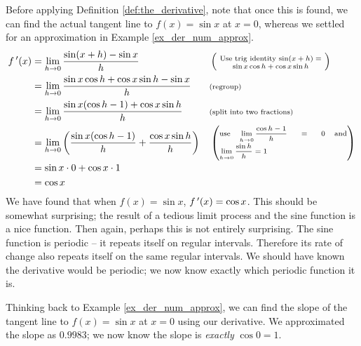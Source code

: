 {Before applying Definition \ref{def:the_derivative}, note that once this is found, we can find the actual tangent line to $f(x) = \sin x$ at $x=0$, whereas we settled for an approximation in Example \ref{ex_der_num_approx}. 
		\small
		\begin{align*}
		\fp(x) &= \lim_{h\to 0} \frac{\sin(x+h)-\sin x}{h} & & \left(\text{\scriptsize \parbox{110pt}{\centering Use trig identity $\sin(x+h) = \sin x\cos h+\cos x\sin h$}}\right) \\
						&= \lim_{h\to 0} \frac{\sin x\cos h+\cos x\sin h-\sin x}{h} & & \text{\scriptsize (regroup)}\\
						&= \lim_{h\to 0} \frac{\sin x(\cos h-1) + \cos x\sin h}{h} & & \text{\scriptsize (split into two fractions)}\\
						&= \lim_{h\to 0} \left(\frac{\sin x(\cos h-1)}{h} + \frac{\cos x\sin h}{h}\right) & & \left(\parbox{130pt}{\scriptsize use $\ds \lim_{h\to 0} \frac{\cos h-1}{h} = 0$ and $\ds \lim_{h\to 0} \frac{\sin h}{h} = 1$}\right)\\
						&=	\sin x\cdot 0 + \cos x \cdot 1 \\
						&= \cos x
		\end{align*}
		\normalsize
We have found that when $f(x) = \sin x$, $f\,'(x) = \cos x$. This should be somewhat surprising; the result of a tedious limit process and the sine function is a nice function. Then again, perhaps this is not entirely surprising. The sine function is periodic -- it repeats itself on regular intervals. Therefore its rate of change also repeats itself on the same regular intervals. We should have known the derivative would be periodic; we now know exactly which periodic function it is.

Thinking back to Example \ref{ex_der_num_approx}, we can find the slope of the tangent line to $f(x)=\sin x$ at $x=0$ using our derivative. We approximated the slope as $0.9983$; we now know the slope is \textit{exactly} $\cos 0 =1$. 
}\\

